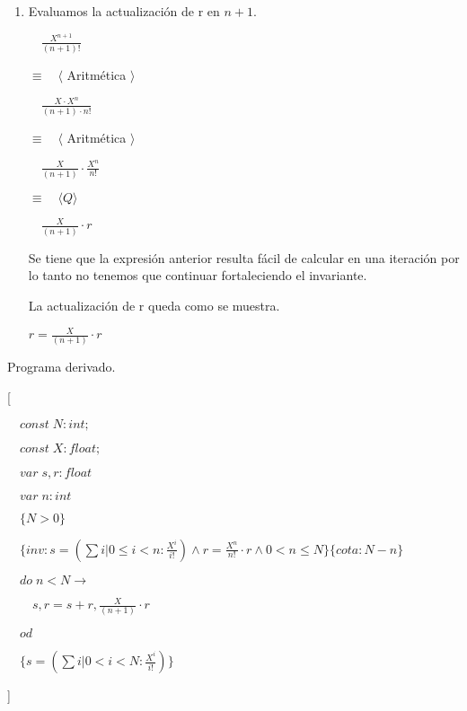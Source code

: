 \documentclass[hidelinks]{article}
\begin{document}
\begin{enumerate}
	\item Evaluamos la actualización de r en $n+1$. \par
	      $\quad \frac{X^{n+1}}{(n+1)!}$ \par
	      $\equiv \quad \langle$ Aritmética $ \rangle$ \par
	      $\quad \frac{X \cdot X^n}{(n+1) \cdot n!}$ \par
	      $\equiv \quad \langle$ Aritmética $ \rangle$ \par
	      $\quad \frac{X}{(n+1)} \cdot \frac{X^n}{n!}$ \par
	      $\equiv \quad \langle Q \rangle$ \par
	      $\quad \frac{X}{(n+1)} \cdot r$ \par

	      Se tiene que la expresión anterior resulta fácil de calcular en una iteración
	      por lo tanto no tenemos que continuar fortaleciendo el invariante.\par
	      La actualización de r queda como se muestra.\par

	      \begin{center}
		      $r = \frac{X}{(n+1)} \cdot r$ \par
	      \end{center}

\end{enumerate}

\newpage

Programa derivado. \par

[\par
	$\quad const \; N: int;$\par
	$\quad const \; X: float;$\par
	$\quad var \; s,r: float$\par
	$\quad var \; n: int$\par
	$\quad\{N > 0\}$\par
	$\quad\{inv: s = (\sum i| 0\leq i < n : \frac{X^i}{i!}) \land r = \frac{X^n}{n!} \cdot r \land 0 < n \leq N \}\{cota: N-n\}$\par
	$\quad do \; n < N \rightarrow $ \par
	$\qquad s,r = s + r,\frac{X}{(n+1)} \cdot r $ \par
	$\quad od $ \par
	$\quad \{s = (\sum i| 0 < i < N : \frac{X^i}{i!})\}$ \par
]

\newpage
\end{document}
